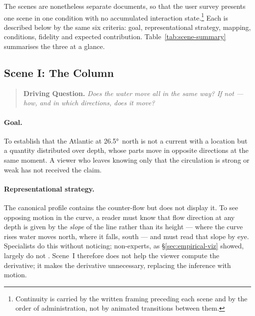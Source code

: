 The scenes are nonetheless separate documents, so that the user survey presents one scene in one condition with no accumulated interaction state.\footnote{Continuity is carried by the written framing preceding each scene and by the order of administration, not by animated transitions between them.} Each is described below by the same six criteria: goal, representational strategy, mapping, conditions, fidelity and expected contribution. Table~\ref{tab:scene-summary} summarises the three at a glance.

\subsection{Scene I: The Column}
\label{subsec:scene-column}

\begin{quote}
\textbf{Driving Question.} \emph{Does the water move all in the same way? If not --- how, and in which directions, does it move?}
\end{quote}



\paragraph{Goal.} To establish that the Atlantic at \ang{26.5}~north is not a current with a location but a quantity distributed over depth, whose parts move in opposite directions at the same moment. A viewer who leaves knowing only that the circulation is strong or weak has not received the claim.

\paragraph{Representational strategy.} The canonical profile contains the counter-flow but does not display it. To see opposing motion in the curve, a reader must know that flow direction at any depth is given by the \emph{slope} of the line rather than its height --- where the curve rises water moves north, where it falls, south --- and must read that slope by eye.%
Specialists do this without noticing; non-experts, as \S\ref{sec:empirical-viz} showed, largely do not \parencite{harold2016, mcmahon2015, fischer2020}. Scene~I therefore does not help the viewer compute the derivative; it makes the derivative unnecessary, replacing the inference with motion.

